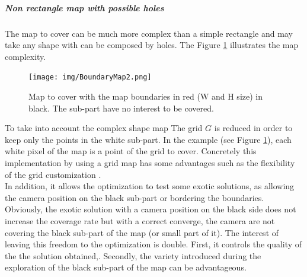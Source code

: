  \subparagraph{Non rectangle map with possible holes} \label{subPara:MapConstraintAndObstacle}
The map to cover can be much more complex than a simple rectangle and may take any shape with can be composed by holes. The Figure \ref{fig:boundaryMap} illustrates the map complexity.%
 \begin{figure}[t!]
 \begin{center}
   \texttt{[image: img/BoundaryMap2.png]}
  \caption{Map to cover with the map boundaries in red (W and H size) in black. The sub-part have no interest to  be covered.   }\label{fig:boundaryMap}
  \endminipage\hfill
  \end{center}
\end{figure}
To take into account the complex shape map %
The grid $G$ is reduced in order to keep only the points in the white sub-part. In the example (see Figure \ref{fig:boundaryMap}), each white pixel of the map is a point of the grid to cover. 
Concretely this implementation by using a grid map has some advantages such as  the flexibility of the grid customization . \\
In addition, it allows the optimization to test some exotic solutions, as allowing the camera position on the black sub-part or bordering the boundaries. Obviously, the exotic solution with a camera position on the black side does not increase the coverage rate  but with a correct converge, the camera are not  covering the black sub-part of the map (or small part of it). The interest of leaving this freedom to the optimization is double. First, it controls the quality of the the solution obtained,. Secondly, the variety introduced during the exploration of the black sub-part of the map can be advantageous. 

%

